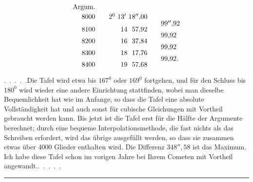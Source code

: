 \[
\renewcommand{\arraystretch}{.65}
\begin{array}{r@{\qquad}r@{\qquad}l}
\text{Argum.}&&\\[4pt]
8000&2^0\ 13'\ 18''{,}00&\\
&&99''{,}92\\
8100&14\ \ 57{,}92&\\
&&99{,}92\\
8200&16\ \ 37{,}84&\\
&&99{,}92\\
8300&18\ \ 17{,}76&\\
&&99{,}92.\\
8400&19\ \ 57{,}68&
\end{array}
\]
\par
{}
\noindent\hspace*{\parindent}.\ .\ .\ .\ .\quad Die Tafel wird etwa bis \(167^0\) oder \(169^0\) fortgehen, und für den Schluss bis \(180^0\) wird wieder eine andere Einrichtung stattfinden, wobei man dieselbe Bequemlichkeit hat wie im Anfange, so dass die Tafel eine absolute Vollständigkeit hat und auch sonst für cubische Gleichungen mit Vortheil gebraucht werden kann. Bis jetzt ist die Tafel erst für die Hälfte der Argumente berechnet; durch eine bequeme Interpolationsmethode, die fast nichts als das Schreiben erfordert, wird das übrige ausgefüllt werden, so dass sie zusammen etwas über 4000 Glieder enthalten wird. Die Differenz \(348''{,}58\) ist das Maximum. Ich habe diese Tafel schon im vorigen Jahre bei Ihrem Cometen mit Vortheil angewandt.\quad .\ .\ .\ .\ .
\par\medskip
\begin{center}\rule{.22\textwidth}{.4pt}\end{center}
\endgroup
